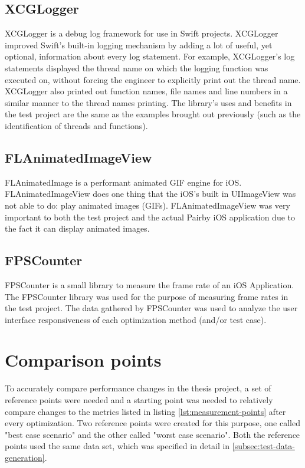 \documentclass[a4paper,12pt]{article}
\begin{document}
\subsection{XCGLogger}
XCGLogger is a debug log framework for use in Swift projects.\cite{XCGLogger} XCGLogger improved Swift's built-in logging mechanism by adding a lot of useful, yet optional, information about every log statement. For example, XCGLogger's log statements displayed the thread name on which the logging function was executed on, without forcing the engineer to explicitly print out the thread name. XCGLogger also printed out function names, file names and line numbers in a similar manner to the thread names printing. The library's uses and benefits in the test project are the same as the examples brought out previously (such as the identification of threads and functions).

\subsection{FLAnimatedImageView}
\label{subsec:flanimatedimageview}
FLAnimatedImage is a performant animated GIF engine for iOS.\cite{FLAnimatedImageView} FLAnimatedImageView does one thing that the iOS's built in UIImageView was not able to do: play animated images (GIFs). FLAnimatedImageView was very important to both the test project and the actual Pairby iOS application due to the fact it can display animated images.

\subsection{FPSCounter}
FPSCounter is a small library to measure the frame rate of an iOS Application.\cite{FPSCounterGithub} The FPSCounter library was used for the purpose of measuring frame rates in the test project. The data gathered by FPSCounter was used to analyze the user interface responsiveness of each optimization method (and/or test case).

\section{Comparison points}
To accurately compare performance changes in the thesis project, a set of reference points were needed and a starting point was needed to relatively compare changes to the metrics listed in listing \autoref{lst:measurement-points} after every optimization. Two reference points were created for this purpose, one called "best case scenario" and the other called "worst case scenario". Both the reference points used the same data set, which was specified in detail in \autoref{subsec:test-data-generation}. 
\end{document}
